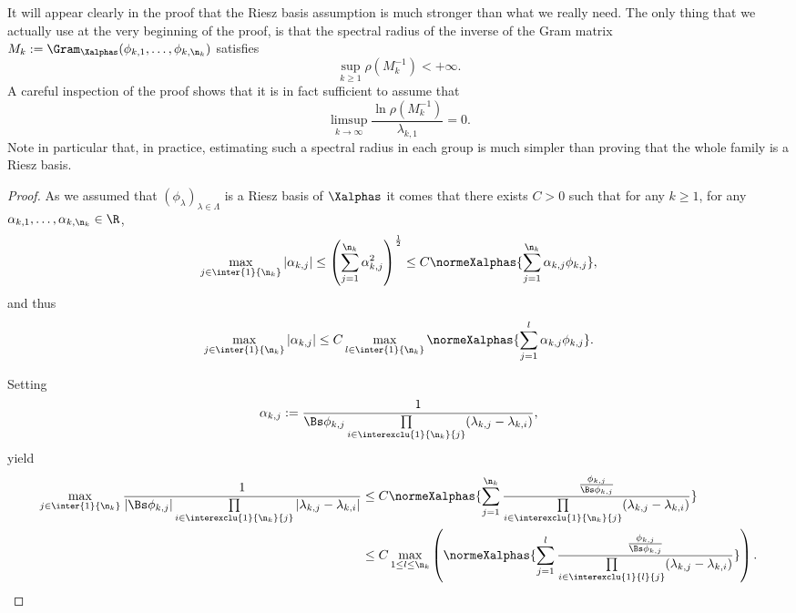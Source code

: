\begin{rema}
It will appear clearly in the proof that the Riesz basis assumption is much stronger than what we really need. The only thing that we actually use at the very beginning of the proof, is that the spectral radius of the inverse of the Gram matrix $M_k:={\Gram}_{\Xalphas}(\phi_{k,1},\dotsc,\phi_{k,\n_k})$ satisfies
\[
\sup_{k\geq 1} \rho(M_k^{-1}) < +\infty.
\]
A careful inspection of the proof shows that it is in fact sufficient to assume that
\[
\limsup_{k\to \infty} \frac{\ln \rho(M_k^{-1})}{\lambda_{k,1}} = 0.
\]
Note in particular that, in practice, estimating such a spectral radius in each group is much simpler than proving that the whole family is a Riesz basis.
\end{rema}

\begin{proof}
As we assumed that $(\phi_\lambda)_{\lambda \in \Lambda}$ is a Riesz basis of $\Xalphas$ it comes that there exists $C>0$ such that for any $k \geq 1$, for any $\alpha_{k,1}, \dots, \alpha_{k,\n_k} \in \R$,
\[
\max_{j\in \inter{1}{\n_k}} |\alpha_{k,j}| \leq \left(\sum_{j=1}^{\n_k} \alpha_{k,j}^2 \right)^{\frac{1}{2}}
\leq C \normeXalphas{ \sum_{j=1}^{\n_k} \alpha_{k,j} \phi_{k,j} },
\]
and thus
\[
\max_{j\in \inter{1}{\n_k}} |\alpha_{k,j}| \leq C \max\limits_{l\in \inter{1}{\n_k}} \normeXalphas{ \sum_{j=1}^{l} \alpha_{k,j} \phi_{k,j} }.
\]

\pagebreak
Setting
\[
\alpha_{k,j} := \frac{1}{ \Bs \phi_{k,j} \prod\limits_{i\in \interexclu{1}{\n_k}{j}} (\lambda_{k,j}-\lambda_{k,i})},
\]
yield
\begin{align*}
\max\limits_{j\in \inter{1}{\n_k}} \frac{1}{ | \Bs\phi_{k,j} | \prod\limits_{i\in\interexclu{1}{\n_k}{j}}|\lambda_{k,j}-\lambda_{k,i} | } &\leq C \normeXalphas{\sum\limits_{j=1}^{\n_k} \frac{ \frac{\phi_{k,j}}{\Bs \phi_{k,j}}}{\prod\limits_{i\in \interexclu{1}{\n_k}{j}} (\lambda_{k,j}-\lambda_{k,i})}}
\\
&\leq C \max\limits_{1 \leq l \leq \n_k} \left(\normeXalphas{\sum\limits_{j=1}^{l} \frac{ \frac{\phi_{k,j}}{\Bs \phi_{k,j}}}{\prod\limits_{i\in \interexclu{1}{l}{j}} (\lambda_{k,j}-\lambda_{k,i})}} \right).
\end{align*}




\end{proof}
